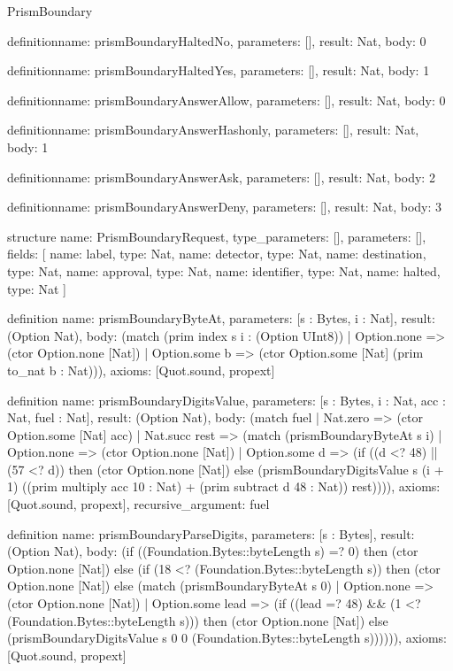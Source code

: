 \begin{lexlean}{PrismBoundary}
\begin{semanticmodule}
definition{name: prismBoundaryHaltedNo, parameters: [], result: Nat, body: 0}

definition{name: prismBoundaryHaltedYes, parameters: [], result: Nat, body: 1}

definition{name: prismBoundaryAnswerAllow, parameters: [], result: Nat, body: 0}

definition{name: prismBoundaryAnswerHashonly, parameters: [], result: Nat, body: 1}

definition{name: prismBoundaryAnswerAsk, parameters: [], result: Nat, body: 2}

definition{name: prismBoundaryAnswerDeny, parameters: [], result: Nat, body: 3}

structure{
  name: PrismBoundaryRequest,
  type_parameters: [],
  parameters: [],
  fields: [
    {name: label, type: Nat},
    {name: detector, type: Nat},
    {name: destination, type: Nat},
    {name: approval, type: Nat},
    {name: identifier, type: Nat},
    {name: halted, type: Nat}
  ]
}

definition{
  name: prismBoundaryByteAt,
  parameters: [s : Bytes, i : Nat],
  result: (Option Nat),
  body: (match (prim index s i : (Option UInt8))
    | Option.none => (ctor Option.none [Nat])
    | Option.some b => (ctor Option.some [Nat] (prim to_nat b : Nat))),
  axioms: [Quot.sound, propext]
}

definition{
  name: prismBoundaryDigitsValue,
  parameters: [s : Bytes, i : Nat, acc : Nat, fuel : Nat],
  result: (Option Nat),
  body: (match fuel
    | Nat.zero => (ctor Option.some [Nat] acc)
    | Nat.succ rest => (match (prismBoundaryByteAt s i)
      | Option.none => (ctor Option.none [Nat])
      | Option.some d => (if ((d <? 48) || (57 <? d)) then (ctor Option.none [Nat]) else (prismBoundaryDigitsValue s (i + 1) ((prim multiply acc 10 : Nat) + (prim subtract d 48 : Nat)) rest)))),
  axioms: [Quot.sound, propext],
  recursive_argument: fuel
}

definition{
  name: prismBoundaryParseDigits,
  parameters: [s : Bytes],
  result: (Option Nat),
  body: (if ((Foundation.Bytes::byteLength s) =? 0) then (ctor Option.none [Nat]) else (if (18 <? (Foundation.Bytes::byteLength s)) then (ctor Option.none [Nat]) else (match (prismBoundaryByteAt s 0)
    | Option.none => (ctor Option.none [Nat])
    | Option.some lead => (if ((lead =? 48) && (1 <? (Foundation.Bytes::byteLength s))) then (ctor Option.none [Nat]) else (prismBoundaryDigitsValue s 0 0 (Foundation.Bytes::byteLength s)))))),
  axioms: [Quot.sound, propext]
}


\end{semanticmodule}
\end{lexlean}
